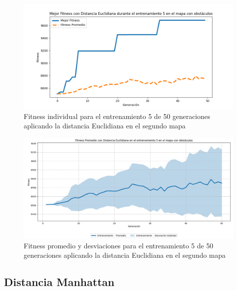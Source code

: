 \documentclass[lettersize, journal]{IEEEtran}
\begin{document}
\begin{figure}[H]
    \centering
    \includegraphics[width=0.9 \linewidth]{Euclidiana/Mapa2/Fitness_5_Map2_Eucli_50Gen.png}
    \caption{Fitness individual para el entrenamiento 5 de 50 generaciones aplicando la distancia Euclidiana en el segundo mapa}
    \label{fig:eucli_5_50_m2}
\end{figure}
\begin{figure}[H]
    \centering
    \includegraphics[width=0.9 \linewidth]{Euclidiana/Mapa2/Fitness_5_Map2_Eucli_50Gen_Sombra.png}
    \caption{Fitness promedio y desviaciones para el entrenamiento 5 de 50 generaciones aplicando la distancia Euclidiana en el segundo mapa}
    \label{fig:eucli_5_50_sombra_m2}
\end{figure}


\subsection{Distancia Manhattan}
\setcounter{figure}{0}
\renewcommand{\thefigure}{S\arabic{figure}-MM2}
\end{document}
